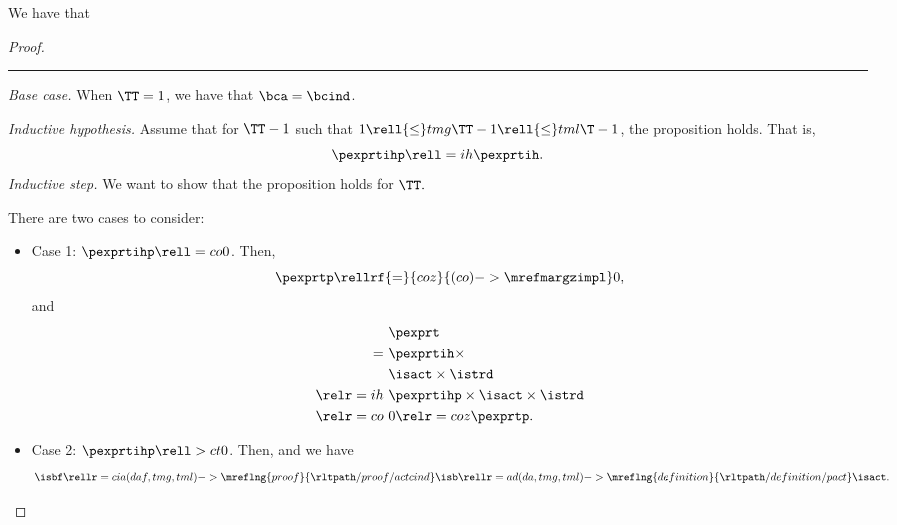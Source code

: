 \begin{proposition}
  We have that %
\end{proposition}

\begin{proof}
  \hrule
  {\it Base case.}
  When $\TT = 1$,
  we have  that
  $\bca = \bcind$.

  \serule
  {\it Inductive hypothesis.}
  Assume that for $\TT - 1$ such that $1 \rell {\le} tmg \TT - 1 \rell {\le} tml \T - 1$,
  the proposition holds. That is,
  $$ \pexprtihp \rell = ih \pexprtih.$$%
  \srule
  {\it Inductive step.}
  We want to show that the proposition holds for $\TT.$

  There are two cases to consider:
  \begin{itemize}
    \item Case 1: $\pexprtihp \rell = co 0$. 
      Then,
      $$\pexprtp  \rellrf{=}{coz}{(co)->\mrefmargzimpl} 0,$$
      and
      \begin{align*}
        &\pexprt \\
        =\ &\pexprtih \times \\
        &\isact \times \istrd\\
        \relr = ih \ & \pexprtihp \times \isact \times \istrd \\
        \relr = co \ & 0 \relr = coz \pexprtp.
      \end{align*}
    \item Case 2: $\pexprtihp \rell > ct 0$. 
      Then, 
      and we have
      $$\isbf \rellr = cia (daf,tmg,tml)->\mreflng{proof}{\rltpath/proof/actcind} \isb 
      \rellr = ad (da,tmg,tml)->\mreflng{definition}{\rltpath/definition/pact} \isact.$$


\end{itemize}
\end{proof}
